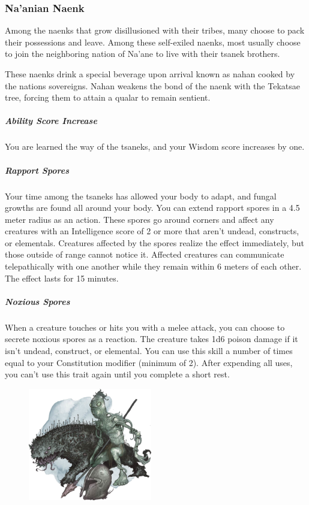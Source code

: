 \subsubsection{Na'anian Naenk}
    Among the naenks that grow disillusioned with their tribes, many choose to pack their possessions and leave.
    Among these self-exiled naenks, most usually choose to join the neighboring nation of Na'ane to live with their tsanek brothers.

    These naenks drink a special beverage upon arrival known as nahan cooked by the nations sovereigns.
    Nahan weakens the bond of the naenk with the Tekatsae tree, forcing them to attain a qualar to remain sentient.

    \subparagraph{Ability Score Increase} You are learned the way of the tsaneks, and your Wisdom score increases by one.

    \subparagraph{Rapport Spores} Your time among the tsaneks has allowed your body to adapt, and fungal growths are found all around your body.
    You can extend rapport spores in a 4.5 meter radius as an action.
    These spores go around corners and affect any creatures with an Intelligence score of 2 or more that aren't undead, constructs, or elementals.
    Creatures affected by the spores realize the effect immediately, but those outside of range cannot notice it.
    Affected creatures can communicate telepathically with one another while they remain within 6 meters of each other.
    The effect lasts for 15 minutes.

    \subparagraph{Noxious Spores} When a creature touches or hits you with a melee attack, you can choose to secrete noxious spores as a reaction.
    The creature takes 1d6 poison damage if it isn't undead, construct, or elemental.
    You can use this skill a number of times equal to your Constitution modifier (minimum of 2).
    After expending all uses, you can't use this trait again until you complete a short rest.

\begin{figure}[!b]
    \centering
    \includegraphics[width=0.48\textwidth]{04kins/img/15naenk_nuen.png}
\end{figure}

